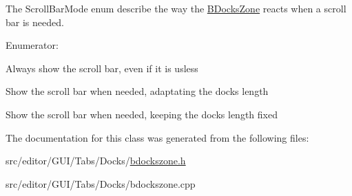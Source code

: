 \-The \-Scroll\-Bar\-Mode enum describe the way the \hyperlink{class_b_docks_zone}{\-B\-Docks\-Zone} reacts when a scroll bar is needed. 

\begin{Desc}
\item[\-Enumerator\-: ]\par
\begin{description}
\item[{\em 
\hypertarget{class_b_docks_zone_aaa04c632b39dce77b61a3a28b7418fdda56cc1afb42c3bd98e3e64599883383a5}{\-Always\-Visible}\label{class_b_docks_zone_aaa04c632b39dce77b61a3a28b7418fdda56cc1afb42c3bd98e3e64599883383a5}
}]\-Always show the scroll bar, even if it is usless \item[{\em 
\hypertarget{class_b_docks_zone_aaa04c632b39dce77b61a3a28b7418fdda4907ef1b3e3b8174073ec707a9753105}{\-Adjustable}\label{class_b_docks_zone_aaa04c632b39dce77b61a3a28b7418fdda4907ef1b3e3b8174073ec707a9753105}
}]\-Show the scroll bar when needed, adaptating the docks length \item[{\em 
\hypertarget{class_b_docks_zone_aaa04c632b39dce77b61a3a28b7418fddae1dd9bb823904efc8224bffef1fe6f22}{\-Fixed}\label{class_b_docks_zone_aaa04c632b39dce77b61a3a28b7418fddae1dd9bb823904efc8224bffef1fe6f22}
}]\-Show the scroll bar when needed, keeping the docks length fixed \end{description}
\end{Desc}



\-The documentation for this class was generated from the following files\-:\begin{DoxyCompactItemize}
\item 
src/editor/\-G\-U\-I/\-Tabs/\-Docks/\hyperlink{bdockszone_8h}{bdockszone.\-h}\item 
src/editor/\-G\-U\-I/\-Tabs/\-Docks/bdockszone.\-cpp\end{DoxyCompactItemize}
